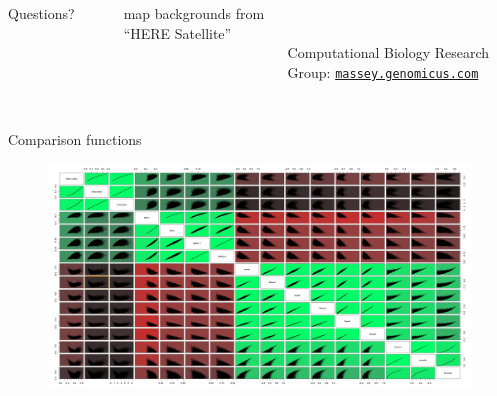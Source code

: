 \documentclass[10pt, aspectratio=43]{beamer}
\begin{document}

\begin{frame}[plain]
\begin{columns}
    \tableofcontents[subsubsectionstyle=hide]

    \begin{Huge}
      Questions?
    \end{Huge}
    \\~\\~\\~\\~\\
    \begin{small}
      \color{lightgray}
      map backgrounds from “HERE Satellite”
    \end{small}
    \\~\\
    Computational Biology Research Group: \href{http://massey.genomicus.com}{\texttt{massey.genomicus.com}}

\end{columns}
\end{frame}


\begin{frame}{}{Comparison functions}
\begin{figure}
  \hspace*{-1cm}
  \includegraphics[width=1.17\textwidth]{../data/comparisonFunctions.png}
\end{figure}
\end{frame}
\end{document}
